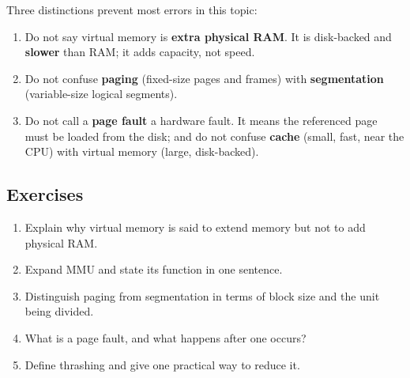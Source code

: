 Three distinctions prevent most errors in this topic:
\begin{enumerate}
  \item Do not say virtual memory is \textbf{extra physical RAM}. It is
    disk-backed and \textbf{slower} than RAM; it adds capacity, not speed.
  \item Do not confuse \textbf{paging} (fixed-size pages and frames) with
    \textbf{segmentation} (variable-size logical segments).
  \item Do not call a \textbf{page fault} a hardware fault. It means the
    referenced page must be loaded from the disk; and do not confuse
    \textbf{cache} (small, fast, near the CPU) with virtual memory (large,
    disk-backed).
\end{enumerate}

\subsection*{Exercises}
\begin{enumerate}[label=\arabic*.]
  \item Explain why virtual memory is said to extend memory but not to add
    physical RAM.
  \item Expand MMU and state its function in one sentence.
  \item Distinguish paging from segmentation in terms of block size and the
    unit being divided.
  \item What is a page fault, and what happens after one occurs?
  \item Define thrashing and give one practical way to reduce it.
\end{enumerate}

